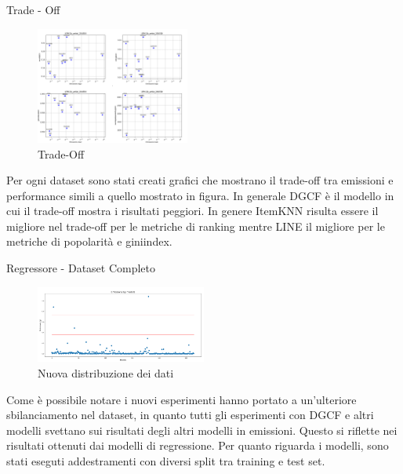 \begin{frame}{Trade - Off}
    \begin{figure}
    \centering
    \includegraphics[width=0.45\textwidth]{images/TradeOff.png}
    \caption{Trade-Off}
\end{figure}

Per ogni dataset sono stati creati grafici che mostrano il trade-off tra emissioni e performance simili a quello mostrato in figura. In generale DGCF è il modello in cui il trade-off mostra i risultati peggiori. In genere ItemKNN risulta essere il migliore nel trade-off per le metriche di ranking mentre LINE il migliore per le metriche di popolarità e giniindex.
\end{frame}




\begin{frame}{Regressore - Dataset Completo}
    \begin{figure}
    \centering
    \includegraphics[width=0.5\textwidth]{images/distribuzioneCompleta.png}
    \caption{Nuova distribuzione dei dati}
\end{figure}

Come è possibile notare i nuovi esperimenti hanno portato a un'ulteriore sbilanciamento nel dataset, in quanto tutti gli esperimenti con DGCF e altri modelli svettano sui risultati degli altri modelli in emissioni.
Questo si riflette nei risultati ottenuti dai modelli di regressione. Per quanto riguarda i modelli,
sono stati eseguti addestramenti con diversi split tra training e test set.

\end{frame}


